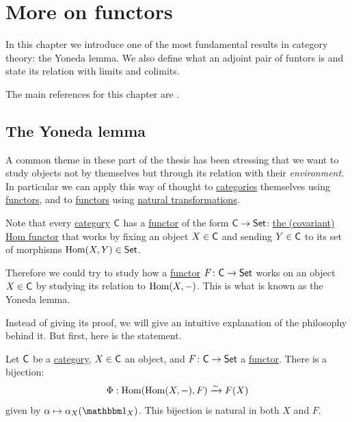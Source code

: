 \documentclass[../../main]{subfiles}
\begin{document}
\chapter{More on functors}

In this chapter we introduce one of the most fundamental results in category theory: the Yoneda lemma.
We also define what an adjoint pair of funtors is and state its relation with limits and colimits.

The main references for this chapter are \cite{riehlCategoryTheoryContext, maclaneCategoriesWorkingMathematician1978, aluffiAlgebraChapter02009}.

\section{The Yoneda lemma}

A common theme in these part of the thesis has been stressing that we want to study objects not by themselves but through its relation with their \textit{environment}.
In particular we can apply this way of thought to \hyperref[def:category]{categories} themselves using \hyperref[def:functor]{functors}, and to \hyperref[def:functor]{functors} using \hyperref[def:natural-transformation]{natural transformations}.

Note that every \hyperref[def:category]{category} \(\mathsf{C}\) has a \hyperref[def:functor]{functor} of the form \(\mathsf{C} \to \mathsf{Set}\): \hyperref[ex:hom-functor]{the (covariant) Hom functor} that works by fixing an object \(X \in \mathsf{C}\) and sending \(Y \in \mathsf{C}\) to its set of morphisms \(\operatorname{Hom}(X, Y) \in \mathsf{Set}\).

Therefore we could try to study how a \hyperref[def:functor]{functor} \(F\colon \mathsf{C} \to \mathsf{Set}\) works on an object \(X \in \mathsf{C}\) by studying its relation to \(\operatorname{Hom}(X, -)\).
This is what is known as the Yoneda lemma.

Instead of giving its proof, we will give an intuitive explanation of the philosophy behind it.
But first, here is the statement.
\begin{theorem}\label{thm:yoneda-lemma}
  Let \(\mathsf{C}\) be a \hyperref[def:category]{category}, \(X \in \mathsf{C}\) an object, and \(F\colon \mathsf{C} \to \mathsf{Set}\) a \hyperref[def:functor]{functor}. There is a bijection:
  \begin{equation*}
    \Phi: \operatorname{Hom}(\operatorname{Hom}(X, -), F) \xrightarrow{\sim} F(X)
  \end{equation*}
  given by \(\alpha \mapsto \alpha_{X}(\id_{X})\). This bijection is natural in both \(X\) and \(F\).
\end{theorem}
\end{document}
